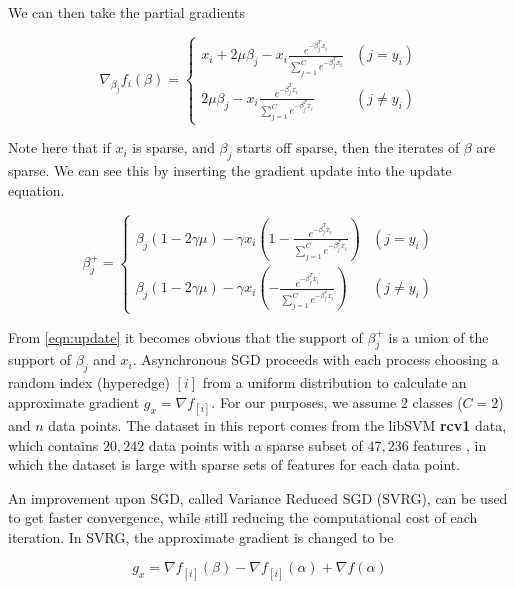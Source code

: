 \documentclass{article}
\begin{document}
We can then take the partial gradients

\begin{equation}\label{eqn:gradient}
	\nabla_{\beta_j} f_i(\beta) = \begin{cases}
								  x_i + 2\mu\beta_j - x_i\frac{e^{-\beta_j^T x_i}}{\sum_{j=1}^C e^{-\beta_j^T x_i}} & (j = y_i) \\
								  2\mu\beta_j - x_i\frac{e^{-\beta_j^T x_i}}{\sum_{j=1}^C e^{-\beta_j^T x_i}} & (j \neq y_i)
								  \end{cases}
\end{equation}

Note here that if $x_i$ is sparse, and $\beta_j$ starts off sparse, then the iterates of $\beta$ are sparse. We can see this by inserting the gradient update into the update equation.


\begin{equation}\label{eqn:update}
	\beta_j^+ = \begin{cases}
								  \beta_j(1-2\gamma\mu) - \gamma x_i(1-\frac{e^{-\beta_j^T x_i}}{\sum_{j=1}^C e^{-\beta_j^T x_i}}) & (j = y_i) \\
								  \beta_j(1-2\gamma\mu) - \gamma x_i(-\frac{e^{-\beta_j^T x_i}}{\sum_{j=1}^C e^{-\beta_j^T x_i}}) & (j \neq y_i)
								  \end{cases}
\end{equation}

From \ref{eqn:update} it becomes obvious that the support of $\beta_j^+$ is a union of the support of $\beta_j$ and $x_i$. Asynchronous SGD proceeds with each process choosing a random index (hyperedge) $[i]$ from a uniform distribution to calculate an approximate gradient $g_x = \nabla f_{[i]}$. For our purposes, we assume 2 classes ($C=2$) and $n$ data points. The dataset in this report comes from the libSVM  \textbf{rcv1} data, which contains $20,242$ data points with a sparse subset of $47,236$ features \cite{libSVM}, in which the dataset is large with sparse sets of features for each data point. 

An improvement upon SGD, called Variance Reduced SGD (SVRG), can be used to get faster convergence, while still reducing the computational cost of each iteration. In SVRG, the approximate gradient is changed to be 

\begin{equation}\label{eqn:svrg_grad}
	g_x = \nabla f_{[i]}(\beta) - \nabla f_{[i]}(\alpha) + \nabla f(\alpha)
\end{equation}
\end{document}
